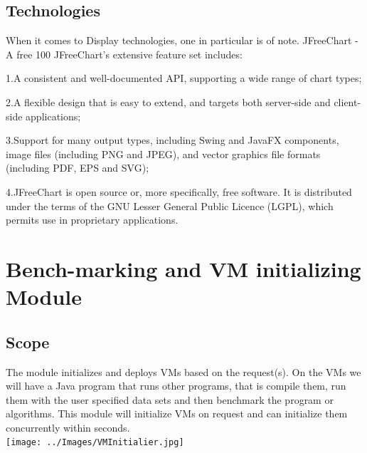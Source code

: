 \documentclass[runningheads,a4paper]{article}
\begin{document}
\subsection{\textbf{Technologies}}
\newline
When it comes to Display technologies, one in particular is of note.
 JFreeChart - A free 100%
 JFreeChart's extensive feature set includes:
	\item 1.A consistent and well-documented API, supporting a wide range of chart types;
	\item 2.A flexible design that is easy to extend, and targets both server-side and client-side applications;
	\item 3.Support for many output types, including Swing and JavaFX components, image files (including PNG and JPEG), and vector graphics file formats (including PDF, EPS and SVG);
	\item 4.JFreeChart is open source or, more specifically, free software. It is distributed under the terms of the GNU Lesser General Public Licence (LGPL), which permits use in proprietary applications.\\
	
\section{Bench-marking and VM initializing Module}
\subsection{Scope}

The module initializes and deploys VMs based on the request(s). On the VMs we will have a Java program that runs other programs, that is compile them, run them with the user specified data sets and then benchmark the program or algorithms. This module will initialize VMs on request and can initialize them concurrently within seconds.\\

\texttt{[image: ../Images/VMInitialier.jpg]}  \\
\end{document}
